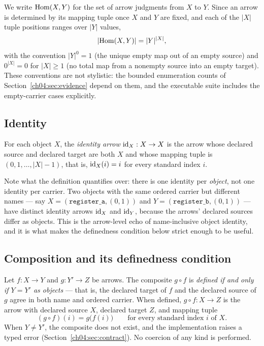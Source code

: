 \begin{notation}
\label{ch04:not:hom}
We write $\mathrm{Hom}(X, Y)$ for the set of arrow judgments from $X$ to $Y$. Since
an arrow is determined by its mapping tuple once $X$ and $Y$ are fixed, and
each of the $|X|$ tuple positions ranges over $|Y|$ values,
\[
  |\mathrm{Hom}(X, Y)| = |Y|^{|X|},
\]
with the convention $|Y|^{0} = 1$ (the unique empty map out of an empty
source) and $0^{|X|} = 0$ for $|X| \ge 1$ (no total map from a nonempty
source into an empty target). These conventions are not stylistic: the
bounded enumeration counts of Section~\ref{ch04:sec:evidence} depend on
them, and the executable suite includes the empty-carrier cases explicitly.
\end{notation}

\subsection{Identity}

\begin{definition}
\label{ch04:def:identity}
For each object $X$, the \emph{identity arrow} $\mathrm{id}_X : X \to X$ is the
arrow whose declared source and declared target are both $X$ and whose
mapping tuple is $(0, 1, \dots, |X|-1)$, that is, $\mathrm{id}_X(i) = i$ for every
standard index $i$.
\end{definition}

Note what the definition quantifies over: there is one identity per
\emph{object}, not one identity per carrier. Two objects with the same
ordered carrier but different names --- say
$X = (\texttt{register\_a}, (0, 1))$ and
$Y = (\texttt{register\_b}, (0, 1))$ --- have distinct identity arrows
$\mathrm{id}_X$ and $\mathrm{id}_Y$, because the arrows' declared sources differ as objects.
This is the arrow-level echo of name-inclusive object identity, and it is
what makes the definedness condition below strict enough to be useful.

\subsection{Composition and its definedness condition}

\begin{definition}[Composition]
\label{ch04:def:comp}
Let $f : X \to Y$ and $g : Y' \to Z$ be arrows. The composite $g \circ f$ is
\emph{defined if and only if $Y = Y'$ as objects} --- that is, the declared
target of $f$ and the declared source of $g$ agree in both name and ordered
carrier. When defined, $g \circ f : X \to Z$ is the arrow with declared
source $X$, declared target $Z$, and mapping tuple
\[
  (g \circ f)(i) = g\bigl(f(i)\bigr)
  \qquad \text{for every standard index } i \text{ of } X.
\]
When $Y \ne Y'$, the composite does not exist, and the implementation raises
a typed error (Section~\ref{ch04:sec:contract}). No coercion of any kind is
performed.
\end{definition}

